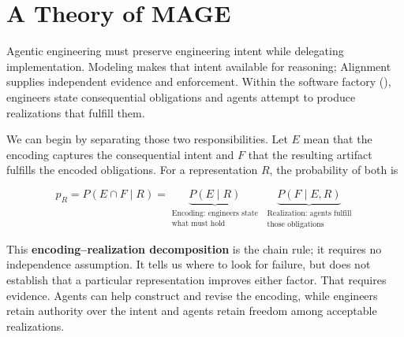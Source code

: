 


\chapter{A Theory of MAGE}


Agentic engineering must preserve engineering intent while delegating implementation. Modeling makes that intent available for reasoning; Alignment supplies independent evidence and enforcement. Within the software factory (), engineers state consequential obligations and agents attempt to produce realizations that fulfill them.


We can begin by separating those two responsibilities. Let \(E\) mean that the encoding captures the consequential intent and \(F\) that the resulting artifact fulfills the encoded obligations. For a representation \(R\), the probability of both is

\[
p_R = P(E \cap F \mid R) = \underbrace{P(E \mid R)}_{\substack{\text{Encoding: engineers state}\\\text{what must hold}}} \;\underbrace{P(F \mid E,R)}_{\substack{\text{Realization: agents fulfill}\\\text{those obligations}}}
\]

This \textbf{encoding–realization decomposition} is the chain rule; it requires no independence assumption. It tells us where to look for failure, but does not establish that a particular representation improves either factor. That requires evidence. Agents can help construct and revise the encoding, while engineers retain authority over the intent and agents retain freedom among acceptable realizations.

